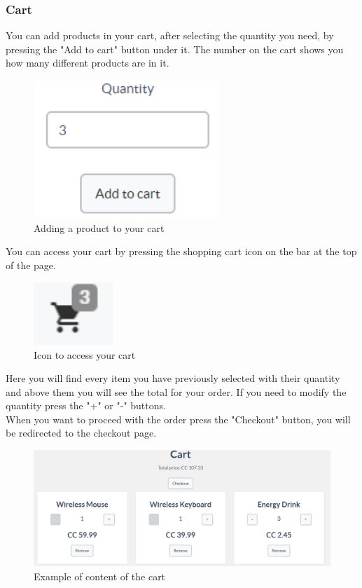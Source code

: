 	\subsubsection{Cart}
	You can add products in your cart, after selecting the quantity you need, 
	by pressing the "Add to cart" button under it. The number on the cart shows
	you how many different products are in it.\\
	\begin{figure}[H]
		\includegraphics[width=7cm]{res/images/add_to_cart.png}
		\centering
		\caption{Adding a product to your cart}
	\end{figure}
	\noindent You can access your cart by pressing the shopping cart icon on 
	the bar at the top of the page.
	\begin{figure}[H]
		\includegraphics[width=3cm]{res/images/cart_icon.png}
		\centering
		\caption{Icon to access your cart}
	\end{figure}
	\noindent Here you will find every item you have previously selected with 
	their quantity and above them you will see the total for your order.
	If you need to modify the quantity press the "+" or "-" buttons. \\
	When you want to proceed with the order press the "Checkout" button, 
	you will be redirected to the checkout page.
	\begin{figure}[H]
		\includegraphics[width=15cm]{res/images/cart_example.png}
		\centering
		\caption{Example of content of the cart}
	\end{figure}
